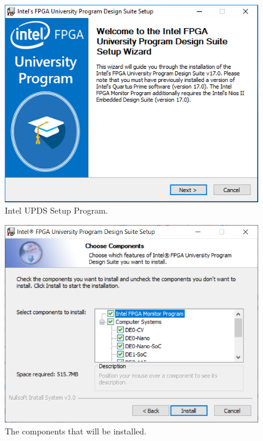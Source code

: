 \documentclass[11pt, twoside, pdftex]{article}
\begin{document}
\begin{enumerate}
\begin{figure}[H]
	\begin{center}
		\includegraphics[scale=1]{screenshots/figure1.png}
	\end{center}
	\caption{Intel UPDS Setup Program.}
	\label{fig:UPDS_setup_start}
\end{figure}

\begin{figure}[H]
   	\begin{center}
            \includegraphics[scale=0.9]{screenshots/figure2.png}
   	\end{center}
      \caption{The components that will be installed.}
      \label{fig:UPDS_setup_installdir}
\end{figure}
~\\


\end{enumerate}
\end{document}
